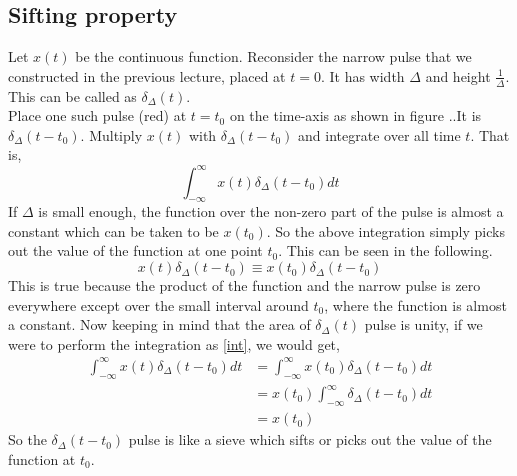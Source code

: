 \subsection{Sifting property}
Let $x(t)$ be the continuous function. Reconsider the narrow pulse that we constructed in the previous lecture, placed at $t = 0$. It has width $\Delta$ and height $\frac{1}{\Delta}$. This can be called as \textbf{$\delta_{\Delta}(t)$}. %
\\

Place one such pulse (red) at $t = t_{0}$ on the time-axis as shown in figure ..It is $\delta_{\Delta}(t - t_{0})$. Multiply $x(t)$ with $\delta_{\Delta}(t - t_{0})$ and integrate over all time $t$. That is,
\begin{equation} \label{int}
\int_{-\infty}^\infty x(t) \delta_{\Delta}(t - t_{0}) dt 
\end{equation}
If $\Delta $ is small enough, the function over the non-zero part of the pulse is almost a constant which can be taken to be $x(t_{0})$. So the above integration simply picks out the value of the function at one point $t_{0}$. This can be seen in the following.
\begin{equation}
x(t) \delta_{\Delta}(t - t_{0}) \equiv x(t_{0}) \delta_{\Delta}(t - t_{0})
\end{equation} 
This is true because the product of the function and the narrow pulse is zero everywhere except over the small interval around $t_{0}$, where the function is almost a constant. Now keeping in mind that the area of $\delta_{\Delta}(t)$ pulse is unity, if we were to perform the integration as \eqref{int}, we would get,
\begin{equation}
\begin{split}
\int_{-\infty}^\infty x(t) \delta_{\Delta}(t - t_{0}) dt  & = \int_{-\infty}^\infty x(t_{0}) \delta_{\Delta}(t - t_{0}) dt \\
& = x(t_{0})  \int_{-\infty}^\infty \delta_{\Delta}(t - t_{0}) dt \\
& = x(t_{0})
\end{split}
\end{equation} 
So the $\delta_{\Delta}(t - t_{0})$ pulse is like a sieve which sifts or picks out the value of the function at $t_{0}$. 

